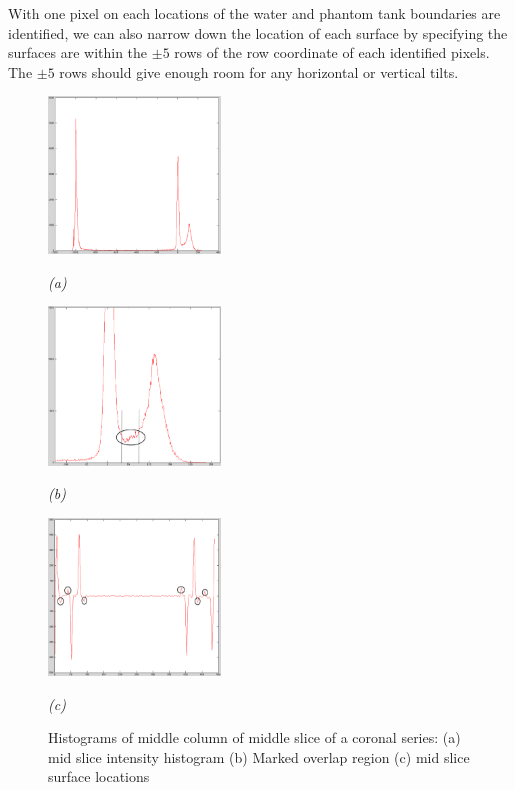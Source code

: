 With one pixel on each locations of the water and phantom tank boundaries are identified, 
we can also narrow down the 
location of each surface by specifying the surfaces are within the $\pm5$ rows of the row coordinate of each
identified pixels. The $\pm5$ rows should give enough room for any horizontal or vertical tilts.

\begin{figure}[htb]
  \begin{minipage}[b]{1.8in}
    \centering
    \centerline{\mbox{\includegraphics[width=1.8in]{data_extraction/images/mid_slice_histogram.eps}}}
    \centerline{\emph{(a)}}
  \end{minipage}
  \hfill
  \begin{minipage}[b]{1.8in}
    \centering
    \centerline{\mbox{\includegraphics[width=1.8in]{data_extraction/images/mid_slice_tank_and_water_overlap_marked.eps}}}
    \centerline{\emph{(b)}}
  \end{minipage}
  \hfill
  \begin{minipage}[b]{1.8in}
    \centering
    \centerline{\mbox{\includegraphics[width=1.8in]{data_extraction/images/mid_slice_gradient_marked.eps}}}
    \centerline{\emph{(c)}}
  \end{minipage}

  \caption{Histograms of middle column of middle slice of a coronal series: (a) mid slice intensity histogram (b) Marked overlap region (c) mid slice surface locations} 
  \label{fig:histograms_mid_coronal}
\end{figure}

